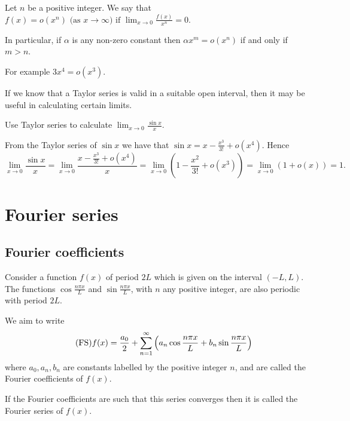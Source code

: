 \documentclass[10pt, a4paper]{article}
\begin{document}
\begin{definition}
    Let $n$ be a positive integer.
    We say that $f(x) = o(x ^ n)\text{ (as $x \rightarrow \infty$) if } \lim_{x \rightarrow 0}\frac{f(x)}{x ^ n} = 0$.
\end{definition}

In particular,
if $\alpha$ is any non-zero constant then $\alpha x ^ m = o(x ^ n)$ if and only if $m > n$.

For example $3x ^ 4 = o(x ^ 3)$.

If we know that a Taylor series is valid in a suitable open interval,
then it may be useful in calculating certain limits.

\begin{example}
    Use Taylor series to calculate $\lim_{x \rightarrow 0}\frac{\sin{x}}{x}$.

    From the Taylor series of $\sin{x}$ we have that $\sin{x} = x - \frac{x ^ 3}{3!} + o(x ^ 4)$.
    Hence
    \[
    \lim_{x \rightarrow 0}\frac{\sin{x}}{x} = \lim_{x \rightarrow 0}\frac{x - \frac{x ^ 3}{3!} + o(x ^ 4)}{x} = \lim_{x \rightarrow 0}\left(1 - \frac{x ^ 2}{3!} + o(x ^ 3)\right) = \lim_{x \rightarrow 0}(1 + o(x)) = 1.
    \]
\end{example}

\newpage

\section{Fourier series}

\subsection{Fourier coefficients}
Consider a function $f(x)$ of period $2L$ which is given on the interval $(-L, L)$.
The functions $\cos\frac{n\pi x}{L}$ and $\sin\frac{n\pi x}{L}$,
with $n$ any positive integer,
are also periodic with period $2L$.

We aim to write
\begin{equation}\tag{FS}
    f(x) = \frac{a_0}{2} + \infsum[n = 1]\left(a_n\cos{\frac{n\pi x}{L}} + b_n\sin{\frac{n\pi x}{L}}\right)
\end{equation}
where $a_0, a_n, b_n$ are constants labelled by the positive integer $n$,
and are called the Fourier coefficients of $f(x)$.

If the Fourier coefficients are such that this series converges then it is called the Fourier series of $f(x)$.
\end{document}
